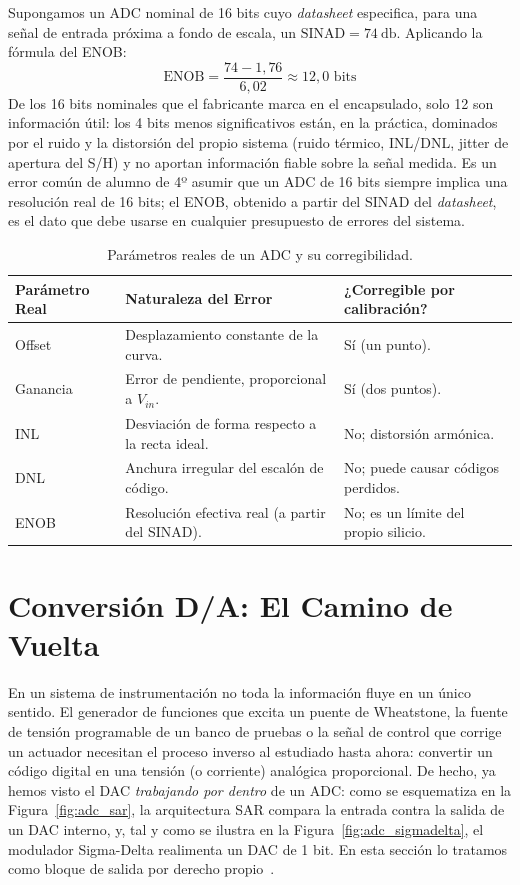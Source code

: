 Supongamos un ADC nominal de 16 bits cuyo \textit{datasheet} especifica, para una señal de entrada próxima a fondo de escala, un $\text{SINAD} = \qty{74}{\decibel}$. Aplicando la fórmula del ENOB:
\begin{equation}
    \text{ENOB} = \frac{74 - 1,76}{6,02} \approx 12,0 \text{ bits}
\end{equation}
De los 16 bits nominales que el fabricante marca en el encapsulado, solo 12 son información útil: los 4 bits menos significativos están, en la práctica, dominados por el ruido y la distorsión del propio sistema (ruido térmico, INL/DNL, jitter de apertura del S/H) y no aportan información fiable sobre la señal medida. Es un error común de alumno de 4º asumir que un ADC de 16 bits siempre implica una resolución real de 16 bits; el ENOB, obtenido a partir del SINAD del \textit{datasheet}, es el dato que debe usarse en cualquier presupuesto de errores del sistema.

\begin{table}[ht]
    \centering
    \begin{tabularx}{\linewidth}{M{2cm} X X}
        \toprule
        \textbf{Parámetro Real} & \textbf{Naturaleza del Error} & \textbf{¿Corregible por calibración?} \\
        \midrule
        Offset & Desplazamiento constante de la curva. & Sí (un punto). \\
        Ganancia & Error de pendiente, proporcional a $V_{in}$. & Sí (dos puntos). \\
        INL & Desviación de forma respecto a la recta ideal. & No; distorsión armónica. \\
        DNL & Anchura irregular del escalón de código. & No; puede causar códigos perdidos. \\
        ENOB & Resolución efectiva real (a partir del SINAD). & No; es un límite del propio silicio. \\
        \bottomrule
    \end{tabularx}
    \caption[Parámetros reales de un ADC y su corregibilidad.]{Parámetros reales de un ADC y su corregibilidad.\protect\label{tab:parametros_adc}}
\end{table}

\section{Conversión D/A: El Camino de Vuelta}\label{sec:dac}

En un sistema de instrumentación no toda la información fluye en un único sentido. El generador de funciones que excita un puente de Wheatstone, la fuente de tensión programable de un banco de pruebas o la señal de control que corrige un actuador necesitan el proceso inverso al estudiado hasta ahora: convertir un código digital en una tensión (o corriente) analógica proporcional. De hecho, ya hemos visto el DAC \emph{trabajando por dentro} de un ADC: como se esquematiza en la Figura~\ref{fig:adc_sar}, la arquitectura SAR compara la entrada contra la salida de un DAC interno, y, tal y como se ilustra en la Figura~\ref{fig:adc_sigmadelta}, el modulador Sigma-Delta realimenta un DAC de 1 bit. En esta sección lo tratamos como bloque de salida por derecho propio~\cite{kester2005dataconversion}.


